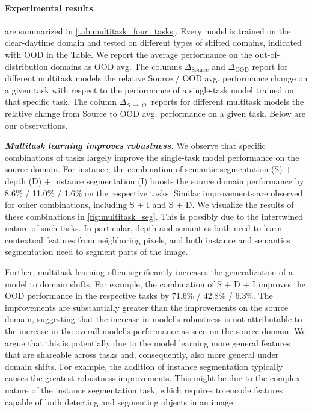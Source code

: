 \paragraph{Experimental results} are summarized in \autoref{tab:multitask_four_tasks}. 
Every model is trained on the clear-daytime domain and tested on different types of shifted domains, indicated with OOD in the Table.
We report the average performance on the out-of-distribution domains as OOD avg.
The columns $\Delta_{\text{Source}}$   and $\Delta_{\text{OOD}}$  report for different multitask models the relative Source / OOD avg. performance change on a given task with respect to the performance of a single-task model trained on that specific task. 
The column $\Delta_{S~\xrightarrow{}~O.}$ reports for different multitask models the relative change from Source to OOD avg. performance on a given task. 
Below are our observations.

\textit{\textbf{Multitask learning improves robustness.}} 
We observe that specific combinations of tasks largely improve the single-task model performance on the source domain. For instance, the combination of semantic segmentation (S) + depth (D) + instance segmentation (I) boosts the source domain performance by 8.6\% / 11.0\% / 1.6\% on the respective tasks. 
Similar improvements are observed for other combinations, including S + I and S + D.  We visualize the results of these combinations in \autoref{fig:multitask_seg}. 
This is possibly due to the intertwined nature of such tasks. In particular, depth and semantics both need to learn contextual features from neighboring pixels, and both instance and semantics segmentation need to segment parts of the image.

Further, multitask learning often significantly increases the generalization of a model to domain shifts. For example, the combination of S + D + I improves the OOD performance in the respective tasks by 71.6\% / 42.8\% / 6.3\%. 
The improvements are substantially greater than the improvements on the source domain, suggesting that the increase in model's robustness is not attributable to the increase in the overall model's performance as seen on the source domain. 
We argue that this is potentially due to the model learning more general features that are shareable across tasks and, consequently, also more general under domain shifts. 
For example, the addition of instance segmentation typically causes the greatest robustness improvements. This might be due to the complex nature of the instance segmentation task, which requires to encode features capable of both detecting and segmenting objects in an image.

